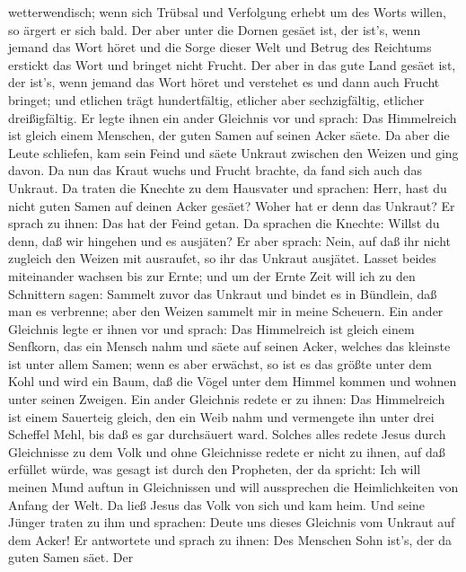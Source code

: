 wetterwendisch; wenn sich Trübsal und Verfolgung erhebt um des Worts
willen, so ärgert er sich bald.  Der aber unter die Dornen
gesäet ist, der ist's, wenn jemand das Wort höret und die Sorge dieser
Welt und Betrug des Reichtums erstickt das Wort und bringet nicht
Frucht.  Der aber in das gute Land gesäet ist, der ist's,
wenn jemand das Wort höret und verstehet es und dann auch Frucht
bringet; und etlichen trägt hundertfältig, etlicher aber sechzigfältig,
etlicher dreißigfältig.  Er legte ihnen ein ander Gleichnis
vor und sprach: Das Himmelreich ist gleich einem Menschen, der guten
Samen auf seinen Acker säete.  Da aber die Leute schliefen,
kam sein Feind und säete Unkraut zwischen den Weizen und ging davon.
 Da nun das Kraut wuchs und Frucht brachte, da fand sich
auch das Unkraut.  Da traten die Knechte zu dem Hausvater
und sprachen: Herr, hast du nicht guten Samen auf deinen Acker gesäet?
Woher hat er denn das Unkraut?  Er sprach zu ihnen: Das hat
der Feind getan. Da sprachen die Knechte: Willst du denn, daß wir
hingehen und es ausjäten?  Er aber sprach: Nein, auf daß
ihr nicht zugleich den Weizen mit ausraufet, so ihr das Unkraut
ausjätet.  Lasset beides miteinander wachsen bis zur Ernte;
und um der Ernte Zeit will ich zu den Schnittern sagen: Sammelt zuvor
das Unkraut und bindet es in Bündlein, daß man es verbrenne; aber den
Weizen sammelt mir in meine Scheuern.  Ein ander Gleichnis
legte er ihnen vor und sprach: Das Himmelreich ist gleich einem
Senfkorn, das ein Mensch nahm und säete auf seinen Acker, 
welches das kleinste ist unter allem Samen; wenn es aber erwächst, so
ist es das größte unter dem Kohl und wird ein Baum, daß die Vögel unter
dem Himmel kommen und wohnen unter seinen Zweigen.  Ein
ander Gleichnis redete er zu ihnen: Das Himmelreich ist einem Sauerteig
gleich, den ein Weib nahm und vermengete ihn unter drei Scheffel Mehl,
bis daß es gar durchsäuert ward.  Solches alles redete
Jesus durch Gleichnisse zu dem Volk und ohne Gleichnisse redete er nicht
zu ihnen,  auf daß erfüllet würde, was gesagt ist durch den
Propheten, der da spricht: Ich will meinen Mund auftun in Gleichnissen
und will aussprechen die Heimlichkeiten von Anfang der Welt.
 Da ließ Jesus das Volk von sich und kam heim. Und seine
Jünger traten zu ihm und sprachen: Deute uns dieses Gleichnis vom
Unkraut auf dem Acker!  Er antwortete und sprach zu ihnen:
Des Menschen Sohn ist's, der da guten Samen säet.  Der

